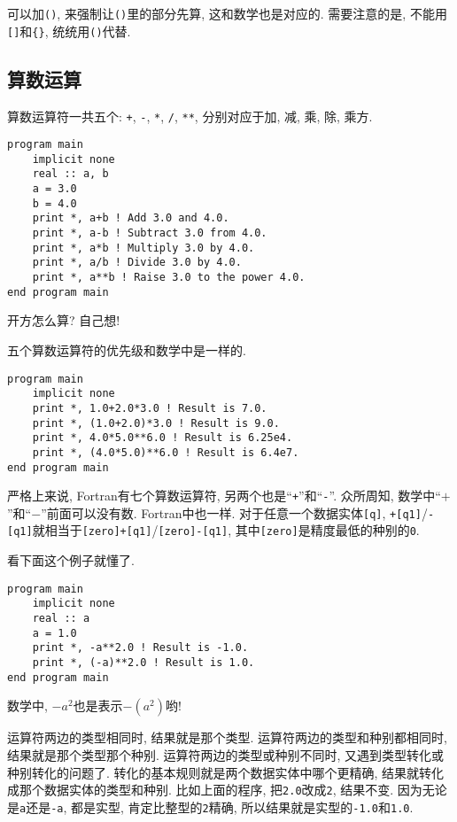 可以加\verb|()|, 来强制让\verb|()|里的部分先算, 这和数学也是对应的. 需要注意的是, 不能用\verb|[]|和\verb|{}|, 统统用\verb|()|代替.

\subsection{算数运算}\label{fortran_numeric_operator}

算数运算符一共五个: \verb|+|, \verb|-|, \verb|*|, \verb|/|, \verb|**|, 分别对应于加, 减, 乘, 除, 乘方.
\begin{lstlisting}
program main
    implicit none
    real :: a, b
    a = 3.0
    b = 4.0
    print *, a+b ! Add 3.0 and 4.0.
    print *, a-b ! Subtract 3.0 from 4.0.
    print *, a*b ! Multiply 3.0 by 4.0.
    print *, a/b ! Divide 3.0 by 4.0.
    print *, a**b ! Raise 3.0 to the power 4.0.
end program main
\end{lstlisting}

开方怎么算? 自己想!

五个算数运算符的优先级和数学中是一样的.
\begin{lstlisting}
program main
    implicit none
    print *, 1.0+2.0*3.0 ! Result is 7.0.
    print *, (1.0+2.0)*3.0 ! Result is 9.0.
    print *, 4.0*5.0**6.0 ! Result is 6.25e4.
    print *, (4.0*5.0)**6.0 ! Result is 6.4e7.
end program main
\end{lstlisting}

严格上来说, Fortran有七个算数运算符, 另两个也是``\verb|+|''和``\verb|-|''. 众所周知, 数学中``$+$''和``$-$''前面可以没有数. Fortran中也一样. 对于任意一个数据实体\verb|[q]|, \verb|+[q1]|/\verb|-[q1]|就相当于\verb|[zero]+[q1]|/\verb|[zero]-[q1]|, 其中\verb|[zero]|是精度最低的种别的\verb|0|.

看下面这个例子就懂了.
\begin{lstlisting}
program main
    implicit none
    real :: a
    a = 1.0
    print *, -a**2.0 ! Result is -1.0.
    print *, (-a)**2.0 ! Result is 1.0.
end program main
\end{lstlisting}

数学中, $-a^2$也是表示$-(a^2)$哟!

运算符两边的类型相同时, 结果就是那个类型. 运算符两边的类型和种别都相同时, 结果就是那个类型那个种别. 运算符两边的类型或种别不同时, 又遇到类型转化或种别转化的问题了. 转化的基本规则就是两个数据实体中哪个更精确, 结果就转化成那个数据实体的类型和种别. 比如上面的程序, 把\verb|2.0|改成\verb|2|, 结果不变. 因为无论是\verb|a|还是\verb|-a|, 都是实型, 肯定比整型的\verb|2|精确, 所以结果就是实型的\verb|-1.0|和\verb|1.0|.


